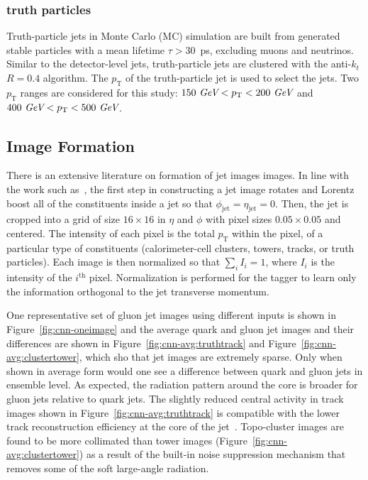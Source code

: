 \subsubsection{truth particles}
Truth-particle jets in Monte Carlo (MC) simulation are built from generated stable particles with a mean lifetime $\tau>30$~ps, 
excluding muons and neutrinos.
Similar to the detector-level jets, truth-particle jets are clustered with the anti-$k_t$ $R=0.4$ algorithm.
The $p_\text{T}$ of the truth-particle jet is used to select the jets.
Two $p_\text{T}$ ranges are considered for this study: $150~\textit{GeV}<p_\text{T}<200~\textit{GeV}$ and $400~\textit{GeV}<p_\text{T}<500~\textit{GeV}$.


\subsection{Image Formation}

There is an extensive literature on formation of jet images images. In line with the work such as~\cite{Cogan:2014oua,Almeida:2015jua}, the first step in constructing a jet image rotates and Lorentz boost all of the constituents inside a jet so that $\phi_\text{jet}=\eta_\text{jet}=0$. Then, the jet is cropped into a grid of size $16\times 16$ in $\eta$ and $\phi$ with pixel sizes $0.05\times 0.05$ and centered.  The intensity of each pixel is the total $p_\text{T}$ within the pixel, of a particular type of constituents (calorimeter-cell clusters, towers, tracks, or truth particles). Each image is then normalized so that $\sum_i I_i=1$, where $I_i$ is the intensity of the $i^\text{th}$ pixel. Normalization is performed for the tagger to learn only the information orthogonal to the jet transverse momentum.  %

One representative set of gluon jet images using different inputs is shown in Figure~\ref{fig:cnn-oneimage} and the average quark and gluon jet images and their differences are shown in Figure~\ref{fig:cnn-avg:truthtrack} and Figure~\ref{fig:cnn-avg:clustertower}, which sho that jet images are extremely sparse. Only when shown in average form would one see a difference between quark and gluon jets in ensemble level. As expected, the radiation pattern around the core is broader for gluon jets relative to quark jets.
The slightly reduced central activity in track images shown in Figure~\ref{fig:cnn-avg:truthtrack} is compatible with the lower track reconstruction efficiency at the core of the jet~\cite{Aaboud:2017all}.
Topo-cluster images are found to be more collimated than tower images (Figure~\ref{fig:cnn-avg:clustertower}) as a result of the built-in noise suppression mechanism that removes some of the soft large-angle radiation.

